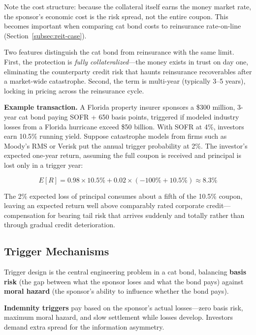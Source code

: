 \documentclass[11pt,openany]{book}
\begin{document}
Note the cost structure: because the collateral itself earns the money market
rate, the sponsor's economic cost is the risk spread, not the entire coupon.
This becomes important when comparing cat bond costs to reinsurance
rate-on-line (Section~\ref{subsec:reit-case}).

Two features distinguish the cat bond from reinsurance with the same limit.
First, the protection is \emph{fully collateralized}---the money exists in
trust on day one, eliminating the counterparty credit risk that haunts
reinsurance recoverables after a market-wide catastrophe. Second, the term is
multi-year (typically 3--5 years), locking in pricing across the reinsurance
cycle.

\textbf{Example transaction.} A Florida property insurer sponsors a \$300
million, 3-year cat bond paying SOFR + 650 basis points, triggered if modeled
industry losses from a Florida hurricane exceed \$50 billion. With SOFR at
4\%, investors earn 10.5\% running yield. Suppose catastrophe models from
firms such as Moody's RMS or Verisk put the annual trigger probability at
2\%. The investor's expected one-year return, assuming the full coupon is
received and principal is lost only in a trigger year:

\[
E[R] = 0.98 \times 10.5\% + 0.02 \times (-100\% + 10.5\%) \approx 8.3\%
\]

The 2\% expected loss of principal consumes about a fifth of the 10.5\%
coupon, leaving an expected return well above comparably rated corporate
credit---compensation for bearing tail risk that arrives suddenly and totally
rather than through gradual credit deterioration.

\subsection{Trigger Mechanisms}
\label{subsec:triggers}

Trigger design is the central engineering problem in a cat bond, balancing
\textbf{basis risk} (the gap between what the sponsor loses and what the bond
pays) against \textbf{moral hazard} (the sponsor's ability to influence
whether the bond pays).

\textbf{Indemnity triggers} pay based on the sponsor's actual losses---zero
basis risk, maximum moral hazard, and slow settlement while losses develop.
Investors demand extra spread for the information asymmetry.
\end{document}
